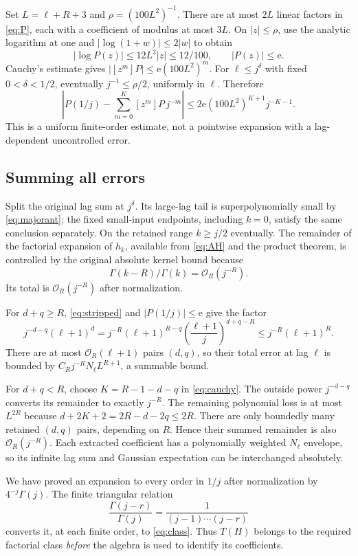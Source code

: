 \documentclass[11pt,letterpaper]{article}
\numberwithin{equation}{section}
\theoremstyle{remark}\newtheorem{remark}[theorem]{Remark}
\newcommand{\e}{\mathrm e}
\newcommand{\Ord}{\mathcal O}
\begin{document}
Set $L=\ell+R+3$ and $\rho=(100L^2)^{-1}$. There are at most $2L$ linear factors in \eqref{eq:P}, each with a coefficient of modulus at most $3L$. On $|z|\le\rho$, use the analytic logarithm at one and $|\log(1+w)|\le2|w|$ to obtain
\[
 |\log P(z)|\le12L^2|z|\le12/100,
 \qquad |P(z)|\le\e.
\]
Cauchy's estimate gives $|[z^m]P|\le\e(100L^2)^m$. For $\ell\le j^\delta$ with fixed $0<\delta<1/2$, eventually $j^{-1}\le\rho/2$, uniformly in $\ell$. Therefore
\begin{equation}\label{eq:cauchy}
 \left|P(1/j)-\sum_{m=0}^{K}[z^m]P\,j^{-m}\right|
 \le2\e(100L^2)^{K+1}j^{-K-1}.
\end{equation}
This is a uniform finite-order estimate, not a pointwise expansion with a lag-dependent uncontrolled error.

\subsection{Summing all errors}
Split the original lag sum at $j^\delta$. Its large-lag tail is superpolynomially small by \eqref{eq:majorant}; the fixed small-input endpoints, including $k=0$, satisfy the same conclusion separately. On the retained range $k\ge j/2$ eventually. The remainder of the factorial expansion of $h_k$, available from \eqref{eq:AH} and the product theorem, is controlled by the original absolute kernel bound because
\[
 \Gamma(k-R)/\Gamma(k)=\Ord_R(j^{-R}).
\]
Its total is $\Ord_R(j^{-R})$ after normalization.

For $d+q\ge R$, \eqref{eq:stripped} and $|P(1/j)|\le\e$ give the factor
\[
 j^{-d-q}(\ell+1)^d
 =j^{-R}(\ell+1)^{R-q}
      \left(\frac{\ell+1}{j}\right)^{d+q-R}
 \le j^{-R}(\ell+1)^R.
\]
There are at most $\Ord_R(\ell+1)$ pairs $(d,q)$, so their total error at lag $\ell$ is bounded by
$C_Rj^{-R}N_\ell L^{R+1}$, a summable bound.

For $d+q<R$, choose $K=R-1-d-q$ in \eqref{eq:cauchy}. The outside power $j^{-d-q}$ converts its remainder to exactly $j^{-R}$. The remaining polynomial loss is at most $L^{2R}$ because
$d+2K+2=2R-d-2q\le2R$. There are only boundedly many retained $(d,q)$ pairs, depending on $R$. Hence their summed remainder is also $\Ord_R(j^{-R})$. Each extracted coefficient has a polynomially weighted $N_\ell$ envelope, so its infinite lag sum and Gaussian expectation can be interchanged absolutely.

We have proved an expansion to every order in $1/j$ after normalization by $4^{-j}\Gamma(j)$. The finite triangular relation
\[
 \frac{\Gamma(j-r)}{\Gamma(j)}=\frac1{(j-1)\cdots(j-r)}
\]
converts it, at each finite order, to \eqref{eq:class}. Thus $T(H)$ belongs to the required factorial class \emph{before} the algebra is used to identify its coefficients.
\end{document}
